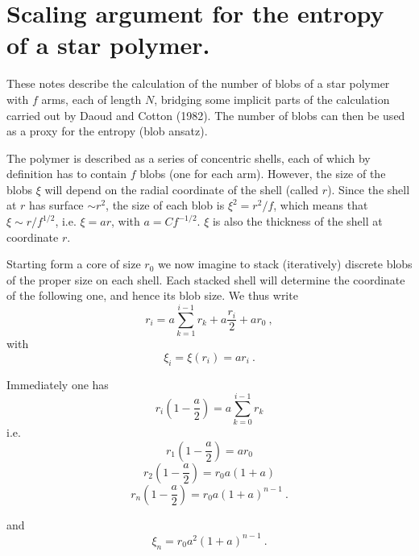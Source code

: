 \documentclass[
preprint,
a4paper,
12pt,
superscriptaddress,
pre]{revtex4}
\begin{document}
\section{Scaling argument for the entropy of a star polymer.}

These notes describe the calculation of the number of blobs of a star
polymer with $f$ arms, each of length $N$, bridging some implicit
parts of the calculation carried out by Daoud and Cotton
(1982)\cite{Daoud1982}. The number of blobs can then be used as a
proxy for the entropy (blob ansatz).

The polymer is described as a series of concentric shells, each of
which by definition has to contain $f$ blobs (one for each
arm). However, the size of the blobs $\xi$ will depend on the radial
coordinate of the shell (called $r$). Since the shell at $r$ has
surface $\sim r^2$, the size of each blob is $\xi^2 = r^2/f$, which
means that $\xi \sim r / f^{1/2}$, i.e. $\xi = a r$, with $a = C
f^{-1/2} $.  $\xi$ is also the thickness of the shell at coordinate
$r$.


Starting form a core of size $r_0$ we now imagine to stack
(iteratively) discrete blobs of the proper size on each shell. Each
stacked shell will determine the coordinate of the following one, and
hence its blob size. We thus write
\begin{displaymath}
  r_i = a \sum_{k=1}^{i-1} r_k + a \frac{r_i}{2} + a r_0 \ ,  
\end{displaymath}
with
\begin{displaymath}
  \xi_i = \xi(r_i) = a r_i \ .
\end{displaymath}

Immediately one has 
\begin{displaymath}
  r_i \left(1 -\frac{a}{2} \right) = a \sum_{k=0}^{i-1} r_k
\end{displaymath}
i.e. 
\begin{displaymath}
  r_1 \left(1 -\frac{a}{2} \right) = a r_0
\end{displaymath}
\begin{displaymath}
  r_2 \left(1 -\frac{a}{2} \right) = r_0 a(1+a)
\end{displaymath}
\begin{displaymath}
  r_n \left(1 -\frac{a}{2} \right) = r_0 a (1+a)^{n-1} \ .
\end{displaymath}

and
\begin{displaymath}
  \xi_n = r_0 a^2 (1+a)^{n-1} \ .
\end{displaymath}
\end{document}
